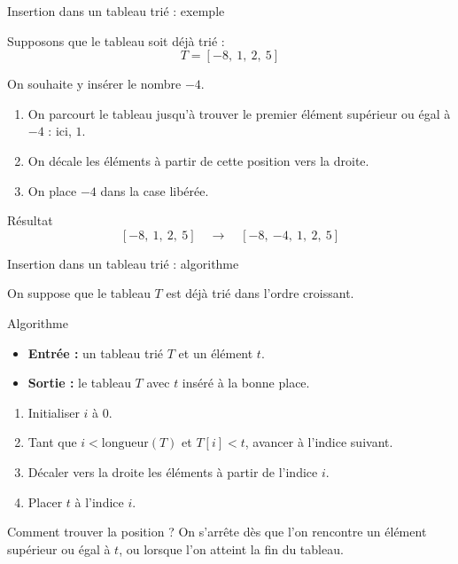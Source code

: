 \documentclass[10pt]{beamer}
\begin{document}
\begin{frame}{Insertion dans un tableau trié : exemple}

Supposons que le tableau soit déjà trié :
\[
T = [-8,\ 1,\ 2,\ 5]
\]

On souhaite y insérer le nombre $-4$.

\pause

\begin{enumerate}
    \item On parcourt le tableau jusqu'à trouver le premier élément
    supérieur ou égal à $-4$ : ici, $1$.
    \pause
    \item On décale les éléments à partir de cette position vers la droite.
    \pause
    \item On place $-4$ dans la case libérée.
\end{enumerate}

\pause

\begin{exampleblock}{Résultat}
\[
[-8,\ 1,\ 2,\ 5]
\quad\longrightarrow\quad
[-8,\ \boxed{-4},\ 1,\ 2,\ 5]
\]
\end{exampleblock}

\end{frame}
\begin{frame}{Insertion dans un tableau trié : algorithme}

On suppose que le tableau $T$ est déjà trié dans l'ordre croissant.

\begin{block}{Algorithme}
\begin{itemize}
    \item \textbf{Entrée :} un tableau trié $T$ et un élément $t$.
    \item \textbf{Sortie :} le tableau $T$ avec $t$ inséré à la bonne place.
\end{itemize}

\medskip

\begin{enumerate}
    \item Initialiser $i$ à $0$.
    \item Tant que $i < \text{longueur}(T)$ et $T[i] < t$,
    avancer à l'indice suivant.
    \item Décaler vers la droite les éléments à partir de l'indice $i$.
    \item Placer $t$ à l'indice $i$.
\end{enumerate}
\end{block}

\pause

\begin{alertblock}{Comment trouver la position ?}
On s'arrête dès que l'on rencontre un élément supérieur ou égal à $t$,
ou lorsque l'on atteint la fin du tableau.
\end{alertblock}

\end{frame}
\end{document}
